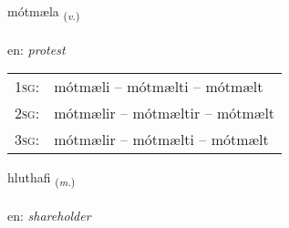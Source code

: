 \documentclass[frontgrid, backgrid]{flacards}\usepackage[]{graphicx}\usepackage[]{color}
\begin{document}
\renewcommand{\flhead}{\vskip5pt \fboxsep=0pt {\small\bfseries\footnotesize Sagnorð | Verb}}
\renewcommand{\fcfoot}{\vskip5pt \fboxsep=0pt \hspace{2pt}{\small\bfseries\footnotesize 2K}}

\renewcommand{\blhead}{\vskip5pt {\small\bfseries\footnotesize Sagnorð | Verb }}
\renewcommand{\bcfoot}{\vskip5pt \hspace{2pt}{\small\bfseries\footnotesize 2K}}


{mótmæla \small{\textsubscript{(\textit{v.})}} \\[1ex] %
\textphonetic{[moutmaila]} \\
en: \emph{protest} \\  [2ex]
\renewcommand*{\arraystretch}{0.8}
\begin{tabular}{p{1cm}l}
\textsc{1sg}: & mótmæli -- mótmælti -- mótmælt \\ 
\textsc{2sg}: & mótmælir -- mótmæltir -- mótmælt \\ 
\textsc{3sg}: & mótmælir -- mótmælti -- mótmælt \\ 
\end{tabular}
}

\renewcommand{\flhead}{\vskip5pt \fboxsep=0pt {\small\bfseries\footnotesize Nafnorð | Noun}}
\renewcommand{\fcfoot}{\vskip5pt \fboxsep=0pt \hspace{2pt}{\small\bfseries\footnotesize 2K}}

\renewcommand{\blhead}{\vskip5pt {\small\bfseries\footnotesize Nafnorð | Noun }}
\renewcommand{\bcfoot}{\vskip5pt \hspace{2pt}{\small\bfseries\footnotesize 2K}}


{hluthafi \small{\textsubscript{(\textit{m.})}} \\[1ex] %
\textphonetic{[l̥ʏːtavɪ]} \\
en: \emph{shareholder} \\  [2ex]
\renewcommand*{\arraystretch}{0.8}
}
\end{document}
